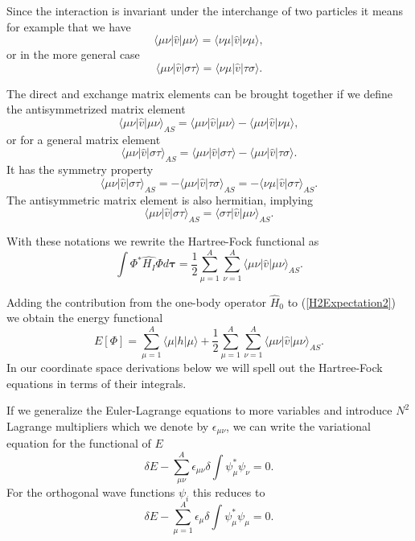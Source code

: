 \documentclass[%
oneside,                 %
final,                   %
10pt]{article}
\begin{document}
Since the interaction is invariant under the interchange of two particles it means for example that we have
\[
\langle \mu\nu|\hat{v}|\mu\nu\rangle =  \langle \nu\mu|\hat{v}|\nu\mu\rangle,  
\]
or in the more general case
\[
\langle \mu\nu|\hat{v}|\sigma\tau\rangle =  \langle \nu\mu|\hat{v}|\tau\sigma\rangle.  
\]


The direct and exchange matrix elements can be  brought together if we define the antisymmetrized matrix element
\[
\langle \mu\nu|\hat{v}|\mu\nu\rangle_{AS}= \langle \mu\nu|\hat{v}|\mu\nu\rangle-\langle \mu\nu|\hat{v}|\nu\mu\rangle,
\]
or for a general matrix element  
\[
\langle \mu\nu|\hat{v}|\sigma\tau\rangle_{AS}= \langle \mu\nu|\hat{v}|\sigma\tau\rangle-\langle \mu\nu|\hat{v}|\tau\sigma\rangle.
\]
It has the symmetry property
\[
\langle \mu\nu|\hat{v}|\sigma\tau\rangle_{AS}= -\langle \mu\nu|\hat{v}|\tau\sigma\rangle_{AS}=-\langle \nu\mu|\hat{v}|\sigma\tau\rangle_{AS}.
\]
The antisymmetric matrix element is also hermitian, implying 
\[
\langle \mu\nu|\hat{v}|\sigma\tau\rangle_{AS}= \langle \sigma\tau|\hat{v}|\mu\nu\rangle_{AS}.
\]




With these notations we rewrite the Hartree-Fock functional as
\begin{equation}
  \int \Phi^*\hat{H_I}\Phi d\mathbf{\tau} 
  = \frac{1}{2}\sum_{\mu=1}^A\sum_{\nu=1}^A \langle \mu\nu|\hat{v}|\mu\nu\rangle_{AS}. \label{H2Expectation2}
\end{equation}

Adding the contribution from the one-body operator $\hat{H}_0$ to
(\ref{H2Expectation2}) we obtain the energy functional 
\begin{equation}
  E[\Phi] 
  = \sum_{\mu=1}^A \langle \mu | h | \mu \rangle +
  \frac{1}{2}\sum_{{\mu}=1}^A\sum_{{\nu}=1}^A \langle \mu\nu|\hat{v}|\mu\nu\rangle_{AS}. \label{FunctionalEPhi}
\end{equation}
In our coordinate space derivations below we will spell out the Hartree-Fock equations in terms of their integrals.




If we generalize the Euler-Lagrange equations to more variables 
and introduce $N^2$ Lagrange multipliers which we denote by 
$\epsilon_{\mu\nu}$, we can write the variational equation for the functional of $E$
\[
  \delta E - \sum_{\mu\nu}^A \epsilon_{\mu\nu} \delta
  \int \psi_{\mu}^* \psi_{\nu} = 0.
\]
For the orthogonal wave functions $\psi_{i}$ this reduces to
\[
  \delta E - \sum_{\mu=1}^A \epsilon_{\mu} \delta
  \int \psi_{\mu}^* \psi_{\mu} = 0.
\]
\end{document}
